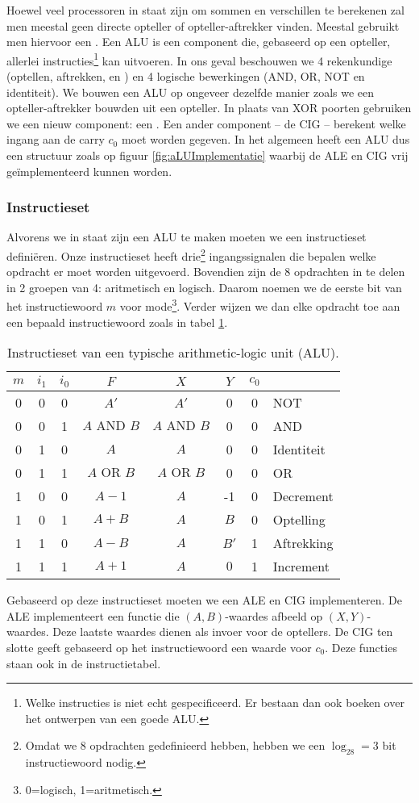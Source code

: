 Hoewel veel processoren in staat zijn om sommen en verschillen te berekenen zal men meestal geen directe opteller of opteller-aftrekker vinden. Meestal gebruikt men hiervoor een . Een ALU is een component die, gebaseerd op een opteller, allerlei instructies\footnote{Welke instructies is niet echt gespecificeerd. Er bestaan dan ook boeken over het ontwerpen van een goede ALU.} kan uitvoeren. In ons geval beschouwen we 4 rekenkundige (optellen, aftrekken,  en ) en 4 logische bewerkingen (AND, OR, NOT en identiteit). We bouwen een ALU op ongeveer dezelfde manier zoals we een opteller-aftrekker bouwden uit een opteller. In plaats van XOR poorten gebruiken we een nieuw component: een . Een ander component -- de CIG -- berekent welke ingang aan de carry $c_0$ moet worden gegeven. In het algemeen heeft een ALU dus een structuur zoals op figuur \ref{fig:aLUImplementatie} waarbij de ALE en CIG vrij ge\"implementeerd kunnen worden.
\subsubsection{Instructieset}
\label{sss:aLUInstructionSet}
Alvorens we in staat zijn een ALU te maken moeten we een instructieset defini\"eren. Onze instructieset heeft drie\footnote{Omdat we 8 opdrachten gedefinieerd hebben, hebben we een $\log_28=3$ bit instructiewoord nodig.} ingangssignalen die bepalen welke opdracht er moet worden uitgevoerd. Bovendien zijn de 8 opdrachten in te delen in 2 groepen van 4: aritmetisch en logisch. Daarom noemen we de eerste bit van het instructiewoord $m$ voor mode\footnote{0=logisch, 1=aritmetisch.}. Verder wijzen we dan elke opdracht toe aan een bepaald instructiewoord zoals in tabel \ref{tbl:aLUInstructionSet}.
\begin{table}[hbt]
\centering
\begin{tabular}{ccc|c|ccc|l}
$m$&$i_1$&$i_0$&$F$&$X$&$Y$&$c_0$&\\\hline
0&0&0&$A'$&$A'$&0&0&NOT\\
0&0&1&$A\mbox{ AND }B$&$A\mbox{ AND }B$&0&0&AND\\
0&1&0&$A$&$A$&0&0&Identiteit\\
0&1&1&$A\mbox{ OR }B$&$A\mbox{ OR }B$&0&0&OR\\
1&0&0&$A-1$&$A$&-1&0&Decrement\\
1&0&1&$A+B$&$A$&$B$&0&Optelling\\
1&1&0&$A-B$&$A$&$B'$&1&Aftrekking\\
1&1&1&$A+1$&$A$&$0$&1&Increment\\
\end{tabular}
\caption{Instructieset van een typische arithmetic-logic unit (ALU).}
\label{tbl:aLUInstructionSet}
\end{table}
Gebaseerd op deze instructieset moeten we een ALE en CIG implementeren. De ALE implementeert een functie die $\left(A,B\right)$-waardes afbeeld op $\left(X,Y\right)$-waardes. Deze laatste waardes dienen als invoer  voor de optellers. De CIG ten slotte geeft gebaseerd op het instructiewoord een waarde voor $c_0$. Deze functies staan ook in de instructietabel.
